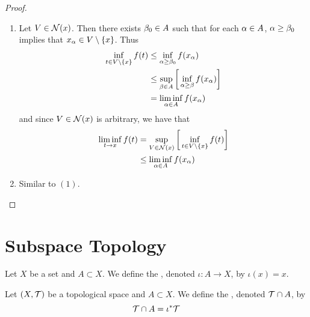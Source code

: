\documentclass{book}
\begin{document}
	\begin{proof}\
		\begin{enumerate}
			\item Let $V \in \mathcal{N}(x)$. Then there exists $\beta_0 \in A$ such that for each $\alpha \in A$, $\alpha \geq \beta_0$ implies that $x_{\alpha} \in V \setminus \{x\}$. Thus 
			\begin{align*}
				\inf_{t \in V \setminus \{x\}} f(t) 
				& \leq \inf_{\alpha \geq \beta_0}f(x_{\alpha}) \\
				& \leq \sup_{\beta \in A} \bigg[ \inf_{\alpha \geq \beta} f(x_{\alpha}) \bigg] \\
				& = \liminf_{\alpha \in A} f(x_{\alpha})
			\end{align*}
			and since $V \in \mathcal{N}(x)$ is arbitrary, we have that
			\begin{align*}
				\liminf_{t \rightarrow x} f(t) 
				&= \sup_{V \in \mathcal{N}(x)} \bigg[ \inf_{t \in V \setminus \{x\}} f(t) \bigg] \\
				& \leq \liminf_{\alpha \in A} f(x_{\alpha})
			\end{align*} 
			\item Similar to $(1)$.
		\end{enumerate}
	\end{proof}































\newpage
\section{Subspace Topology}

\begin{defn}
	Let $X$ be a set and $A \subset X$. We define the , denoted $\iota: A \rightarrow X$, by $\iota(x) = x$. 
\end{defn}

\begin{defn}
	Let $(X, \mathcal{T})$ be a topological space and $A \subset X$. We define the , denoted $\mathcal{T} \cap A$, by $$\mathcal{T} \cap A = \iota^* \mathcal{T} $$
\end{defn}
\end{document}
